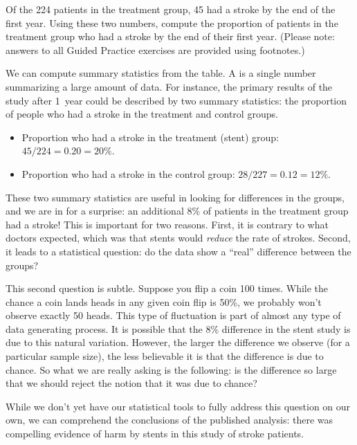 \begin{exercisewrap}
\begin{nexercise}
Of the 224 patients in the treatment group, 45 had a stroke by the end of the first year. Using these two numbers, compute the proportion of patients in the treatment group who had a stroke by the end of their first year. (Please note: answers to all Guided Practice exercises are provided using footnotes.)\footnotemark
\end{nexercise}
\end{exercisewrap}

We can compute summary statistics from the table.
A  is a single number summarizing
a large amount of data.
For instance, the primary results of the study after 1~year
could be described by two summary statistics:
the proportion of people who had a stroke in the treatment
and control groups.
\begin{itemize}
\setlength{\itemsep}{0mm}
\item[] Proportion who had a stroke in the treatment (stent) group: $45/224 = 0.20 = 20\%$.
\item[] Proportion who had a stroke in the control group: $28/227 = 0.12 = 12\%$.
\end{itemize}
These two summary statistics are useful in looking for differences in the groups, and we are in for a surprise: an additional 8\% of patients in the treatment group had a stroke! This is important for two reasons. First, it is contrary to what doctors expected, which was that stents would \emph{reduce} the rate of strokes. Second, it leads to a statistical question: do the data show a ``real'' difference between the groups?

This second question is subtle. Suppose you flip a coin 100 times. While the chance a coin lands heads in any given coin flip is 50\%, we probably won't observe exactly 50 heads. This type of fluctuation is part of almost any type of data generating process. It is possible that the 8\% difference in the stent study is due to this natural variation. However, the larger the difference we observe (for a particular sample size), the less believable it is that the difference is due to chance. So what we are really asking is the following: is the difference so large that we should reject the notion that it was due to chance?

While we don't yet have our statistical tools to fully address this question on our own, we can comprehend the conclusions of the published analysis: there was compelling evidence of harm by stents in this study of stroke patients.

